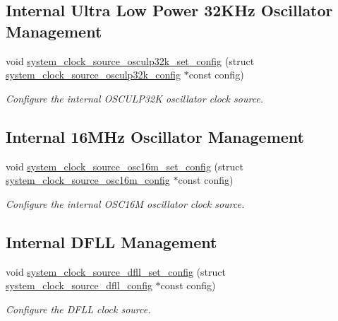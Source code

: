 \subsection*{Internal Ultra Low Power 32\+K\+Hz Oscillator Management}
\begin{DoxyCompactItemize}
\item 
void \hyperlink{group__asfdoc__sam0__system__clock__group_gab4e78c66dccd26a38cbf1e32af9da6d1}{system\+\_\+clock\+\_\+source\+\_\+osculp32k\+\_\+set\+\_\+config} (struct \hyperlink{structsystem__clock__source__osculp32k__config}{system\+\_\+clock\+\_\+source\+\_\+osculp32k\+\_\+config} $\ast$const config)
\begin{DoxyCompactList}\small\item\em Configure the internal O\+S\+C\+U\+L\+P32\+K oscillator clock source. \end{DoxyCompactList}\end{DoxyCompactItemize}
\subsection*{Internal 16\+M\+Hz Oscillator Management}
\begin{DoxyCompactItemize}
\item 
void \hyperlink{group__asfdoc__sam0__system__clock__group_ga15179882c18d7e09753939c4d1d136cc}{system\+\_\+clock\+\_\+source\+\_\+osc16m\+\_\+set\+\_\+config} (struct \hyperlink{structsystem__clock__source__osc16m__config}{system\+\_\+clock\+\_\+source\+\_\+osc16m\+\_\+config} $\ast$const config)
\begin{DoxyCompactList}\small\item\em Configure the internal O\+S\+C16\+M oscillator clock source. \end{DoxyCompactList}\end{DoxyCompactItemize}
\subsection*{Internal D\+F\+L\+L Management}
\begin{DoxyCompactItemize}
\item 
void \hyperlink{group__asfdoc__sam0__system__clock__group_gaa15073d0d4bd347bf8855ac20fd1b93c}{system\+\_\+clock\+\_\+source\+\_\+dfll\+\_\+set\+\_\+config} (struct \hyperlink{structsystem__clock__source__dfll__config}{system\+\_\+clock\+\_\+source\+\_\+dfll\+\_\+config} $\ast$const config)
\begin{DoxyCompactList}\small\item\em Configure the D\+F\+L\+L clock source. \end{DoxyCompactList}\end{DoxyCompactItemize}
